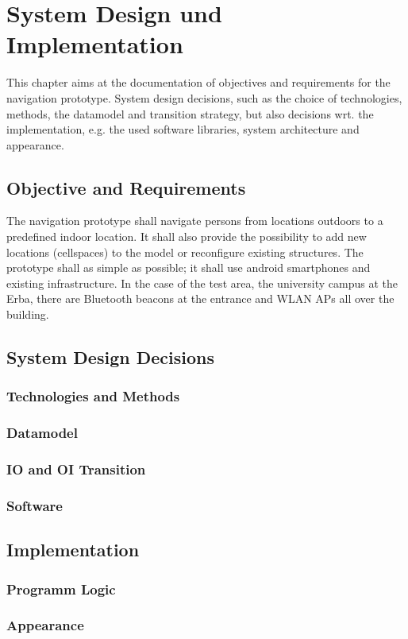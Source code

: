 \chapter{System Design und Implementation}
This chapter aims at the documentation of objectives and requirements for the navigation prototype. System design decisions, such as the choice of technologies, methods, the datamodel and transition strategy, but also decisions wrt. the implementation, e.g. the used software libraries, system architecture and appearance.

\section{Objective and Requirements} 
The navigation prototype shall navigate persons from locations outdoors to a predefined indoor location. It shall also provide the possibility to add new locations (cellspaces) to the model or reconfigure existing structures. The prototype shall as simple as possible; it shall use android smartphones and existing infrastructure. In the case of the test area, the university campus at the Erba, there are Bluetooth beacons at the entrance and WLAN APs all over the building.

\section{System Design Decisions}
\subsection*{Technologies and Methods}

\subsection*{Datamodel}
\subsection*{IO and OI Transition}
\subsection*{Software}
\section{Implementation} 
\subsection*{Programm Logic} %
\subsection*{Appearance} %
